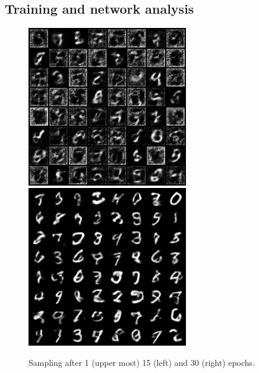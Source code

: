 \documentclass{article}
\begin{document}
\subsection{Training and network analysis}
\begin{figure}[H]%
    \centering
    \includegraphics[width=7cm]{imgs/sample_1.png}
    \includegraphics[width=7cm]{imgs/sample_30.png}
    \caption{Sampling after 1 (upper most) 15 (left) and 30 (right) epochs.}%
    \label{samples}%
\end{figure}
\end{document}
